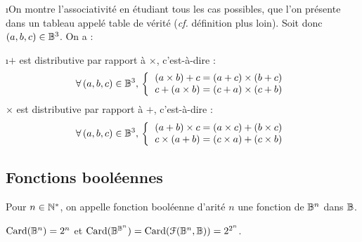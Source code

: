 		\begin{Preuve}
			\i On montre l'associativité en étudiant tous les cas possibles, que l'on présente dans un tableau appelé table de vérité (\emph{cf.} définition plus loin). Soit donc \((a,b,c) \in \mathbb{B}^3\). On a :
		\end{Preuve}
		
		\eqskip{2mm}
		\colsep{1.5pt}
		\begin{Proprietes}[distributivité]
			\i \(+\) est distributive par rapport à \(\times\), c'est-à-dire :
				\[
				\forall \, (a,b,c) \in \bb{B}^3, \,
				\left\{ \begin{tabular}[h]{l}
					\((a \times b) + c = (a+c) \times (b+c)\) \\
					\(c + (a \times b) = (c+a) \times (c+b)\)
				\end{tabular} \right.
				\]
			\ii \(\times\) est distributive par rapport à \(+\), c'est-à-dire :
				\[
				\forall \, (a,b,c) \in \bb{B}^3, \,
				\left\{ \begin{tabular}[h]{l}
					\((a + b) \times c = (a \times c) + (b \times c)\) \\
					\(c \times (a + b) = (c \times a) + (c \times b)\)
				\end{tabular} \right.
				\]
		\end{Proprietes}
		
		\begin{Preuve}
		\end{Preuve}
		
	\subsection{Fonctions booléennes}
		
		\begin{Definition}
			Pour \(n \in \mathbb{N}^*\), on appelle fonction booléenne d'arité \(n\) une fonction de \(\mathbb{B}^n\) dans \(\mathbb{B}\).
		\end{Definition}
		
		\begin{Remarque}
			\(\operatorname{Card} (\mathbb{B}^n) = 2^n\) et \(\operatorname{Card} (\mathbb{B}^{\mathbb{B}^n}) = \operatorname{Card} (\EuScript{F} (\mathbb{B}^n,\mathbb{B})) = 2^{2^n}\).
		\end{Remarque}
		
